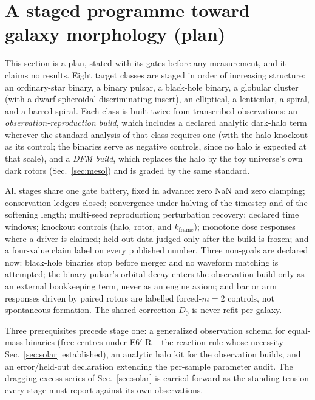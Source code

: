 \documentclass[aps,reprint,amsmath,amssymb,nofootinbib,superscriptaddress,floatfix]{revtex4-2}
\begin{document}
\section{A staged programme toward galaxy morphology (plan)}
\label{sec:plan}

This section is a plan, stated with its gates before any measurement,
and it claims no results. Eight target classes are staged in order of
increasing structure: an ordinary-star binary, a binary pulsar, a
black-hole binary, a globular cluster (with a dwarf-spheroidal
discriminating insert), an elliptical, a lenticular, a spiral, and a
barred spiral. Each class is built twice from transcribed observations:
an \emph{observation-reproduction build}, which includes a declared
analytic dark-halo term wherever the standard analysis of that class
requires one (with the halo knockout as its control; the binaries serve
as negative controls, since no halo is expected at that scale), and a
\emph{DFM build}, which replaces the halo by the toy universe's own
dark rotors (Sec.~\ref{sec:meso}) and is graded by the same standard.

All stages share one gate battery, fixed in advance: zero NaN and zero
clamping; conservation ledgers closed; convergence under halving of the
timestep and of the softening length; multi-seed reproduction;
perturbation recovery; declared time windows; knockout controls (halo,
rotor, and $k_{\mathrm{frame}}$); monotone dose responses where a driver
is claimed; held-out data judged only after the build is frozen; and a
four-value claim label on every published number. Three non-goals are
declared now: black-hole binaries stop before merger and no waveform
matching is attempted; the binary pulsar's orbital decay enters the
observation build only as an external bookkeeping term, never as an
engine axiom; and bar or arm responses driven by paired rotors are
labelled forced-$m{=}2$ controls, not spontaneous formation. The shared
correction $D_0$ is never refit per galaxy.

Three prerequisites precede stage one: a generalized observation schema
for equal-mass binaries (free centres under E6$'$-R -- the reaction rule
whose necessity Sec.~\ref{sec:solar} established), an analytic halo kit
for the observation builds, and an error/held-out declaration extending
the per-sample parameter audit. The dragging-excess series of
Sec.~\ref{sec:solar} is carried forward as the standing tension every
stage must report against its own observations.
\end{document}
